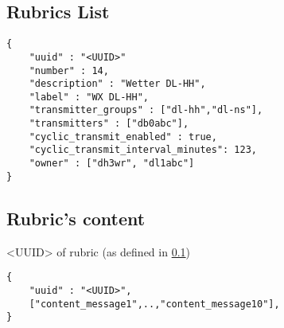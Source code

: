 \subsection{Rubrics List}
\label{rubric_list}

\begin{lstlisting}
{
   	"uuid" : "<UUID>"
    "number" : 14,
    "description" : "Wetter DL-HH",
    "label" : "WX DL-HH",
    "transmitter_groups" : ["dl-hh","dl-ns"],
    "transmitters" : ["db0abc"],
	"cyclic_transmit_enabled" : true,
    "cyclic_transmit_interval_minutes": 123,
 	"owner" : ["dh3wr", "dl1abc"]
}
\end{lstlisting}

\subsection{Rubric's content}
<UUID> of rubric (as defined in \ref{rubric_list})

\begin{lstlisting}
{
	"uuid" : "<UUID>",
	["content_message1",..,"content_message10"],
}
\end{lstlisting}